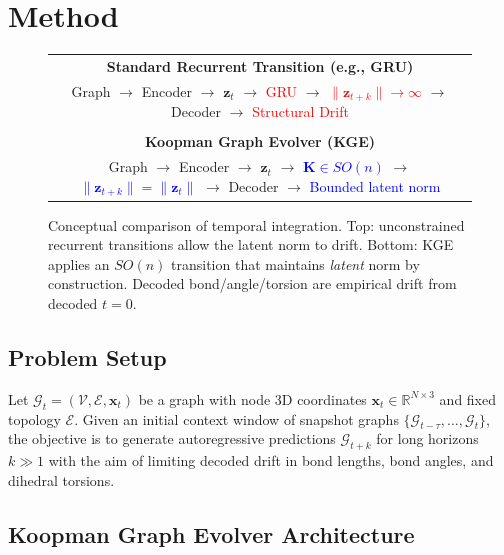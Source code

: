 \documentclass{article}
\newcommand{\K}{\mathbf{K}}
\newcommand{\z}{\mathbf{z}}
\newcommand{\x}{\mathbf{x}}
\newcommand{\R}{\mathbb{R}}
\newcommand{\GKE}{\textsc{KGE}}
\begin{document}
\section{Method}
\label{sec:method}

\begin{figure}[t]
  \centering
  \small
  \renewcommand{\arraystretch}{1.2}
  \begin{tabular}{c}
    \textbf{Standard Recurrent Transition (e.g., GRU)} \\
    Graph $\to$ Encoder $\to$ $\z_t$ $\to$ \textcolor{red}{GRU} $\to$ \textcolor{red}{$\|\z_{t+k}\| \to \infty$} $\to$ Decoder $\to$ \textcolor{red}{Structural Drift} \\
    \\
    \textbf{Koopman Graph Evolver (\GKE{})} \\
    Graph $\to$ Encoder $\to$ $\z_t$ $\to$ \textcolor{blue}{$\K\in SO(n)$} $\to$ \textcolor{blue}{$\|\z_{t+k}\| = \|\z_t\|$} $\to$ Decoder $\to$ \textcolor{blue}{Bounded latent norm}
  \end{tabular}
  \vspace{0.5em}
  \caption{Conceptual comparison of temporal integration. Top: unconstrained recurrent transitions allow the latent norm to drift. Bottom: \GKE{} applies an $SO(n)$ transition that maintains \emph{latent} norm by construction. Decoded bond/angle/torsion are empirical drift from decoded $t=0$.}
  \label{fig:concept}
\end{figure}

\subsection{Problem Setup}
\label{sec:setup}

Let $\mathcal{G}_t = (\mathcal{V}, \mathcal{E}, \x_t)$ be a graph with node 3D coordinates $\x_t \in \R^{N \times 3}$ and fixed topology $\mathcal{E}$. Given an initial context window of snapshot graphs $\{\mathcal{G}_{t-\tau},\dots,\mathcal{G}_t\}$, the objective is to generate autoregressive predictions $\mathcal{G}_{t+k}$ for long horizons $k \gg 1$ with the aim of limiting decoded drift in bond lengths, bond angles, and dihedral torsions.

\subsection{Koopman Graph Evolver Architecture}
\end{document}
